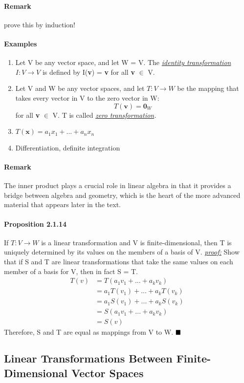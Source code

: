 \documentclass[11pt]{article}
\newcommand{\ti}[1]{\textit{#1}}
\newcommand{\tb}[1]{\textbf{#1}}
\newcommand{\under}[1]{\underline{#1}}
\newcommand{\proof}[0]{\textit{\underline{proof:} }}
\newcommand{\litran}[0]{$T: V \rightarrow W$ }
\newcommand{\qed}[0]{$\hfill\blacksquare$}
\newcommand{\vx}[0]{\tb{x}}
\begin{document}
	\paragraph{Remark} prove this by induction!
	\paragraph{Examples}
	\begin{enumerate}
		\item Let V be any vector space, and let W = V. The \ti{\under{identity transformation}} $I: V \rightarrow V$ is defined by I(\tb{v}) = \tb{v} for all \tb{v} $\in$ V.
		\item Let V and W be any vector spaces, and let \litran be the mapping that takes every vector in V to the zero vector in W:
		$$ T(\tb{v}) = \tb{0}_W$$
		for all \tb{v} $\in$ V. T is called \it{\under{zero transformation}}.
		\item $T(\vx) = a_1x_1 + ... + a_nx_n$
		\item Differentiation, definite integration
	\end{enumerate} 
	\paragraph{Remark} The inner product plays a crucial role in linear algebra in that it provides a bridge between algebra and geometry, which is the heart of the more advanced material that appears later in the text.
	\paragraph{Proposition 2.1.14} If \litran is a linear transformation and V is finite-dimensional, then T is uniquely determined by its values on the members of a basis of V. \newline
	\proof Show that if S and T are linear transformations that take the same values on each member of a basis for V, then in fact S = T. \newline
	\begin{align*}
		T(v) &= T(a_1v_1 + ... + a_kv_k)\\
		&= a_1T(v_1) + ... + a_kT(v_k)\\
		&= a_1S(v_1) + ... + a_kS(v_k)\\
		&= S(a_1v_1 + ... + a_kv_k)\\
		&= S(v)
	\end{align*}
	Therefore, S and T are equal as mappings from V to W. \qed
	\subsection{Linear Transformations Between Finite-Dimensional Vector Spaces}
\end{document}
